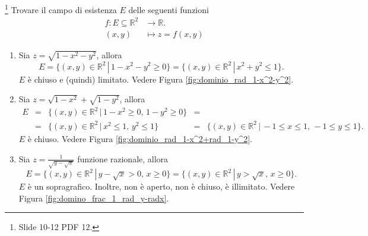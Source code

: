 \begin{example}\footnote{Slide 10-12 PDF 12.}
    Trovare il campo di esistenza $E$ delle seguenti funzioni
    \begin{equation*}
        \begin{aligned}
            f\colon E\subseteq\mathbb R^2 &\rightarrow \mathbb R.\\
            (x,y)&\mapsto z=f(x,y)
        \end{aligned}
    \end{equation*}
    \begin{enumerate}
        \item Sia $z=\sqrt{1-x^2-y^2}$, allora
        \begin{equation*}
            E=\{(x,y)\in\mathbb R^2\,|\, 1-x^2-y^2\geq 0\}=\{(x,y)\in\mathbb R^2\,|\, x^2+y^2\leq 1\}.
        \end{equation*}
        $E$ è chiuso e (quindi) limitato. Vedere Figura \ref{fig:dominio_rad_1-x^2-y^2}.
        \item Sia $z=\sqrt{1-x^2}+\sqrt{1-y^2}$, allora
        \begin{equation*}
            \begin{matrix}
                E&=&\{(x,y)\in\mathbb R^2\,|\, 1-x^2\geq 0,\, 1-y^2\geq 0\}&=&\\
                &=&\{(x,y)\in\mathbb R^2\,|\, x^2\leq 1,\, y^2\leq 1\}&=&\{(x,y)\in\mathbb R^2\,|\, -1\leq x\leq 1,\, -1\leq y\leq 1\}.
            \end{matrix}
        \end{equation*}
        $E$ è chiuso. Vedere Figura \ref{fig:dominio_rad_1-x^2+rad_1-y^2}.
        \item Sia $z=\frac{1}{\sqrt{y-\sqrt{x}}}$ funzione razionale, allora
        \begin{equation*}
            E=\{(x,y)\in\mathbb R^2\,|\, y-\sqrt{x}>0,\, x\geq 0\}=\{(x,y)\in\mathbb R^2\,|\, y>\sqrt{x},\, x\geq 0\}.
        \end{equation*}
        $E$ è un sopragrafico. Inoltre, non è aperto, non è chiuso, è illimitato. Vedere Figura \ref{fig:domino_frac_1_rad_y-radx}.
    \end{enumerate}
    \begin{figure}
    \centering
\end{figure}
\end{example}
